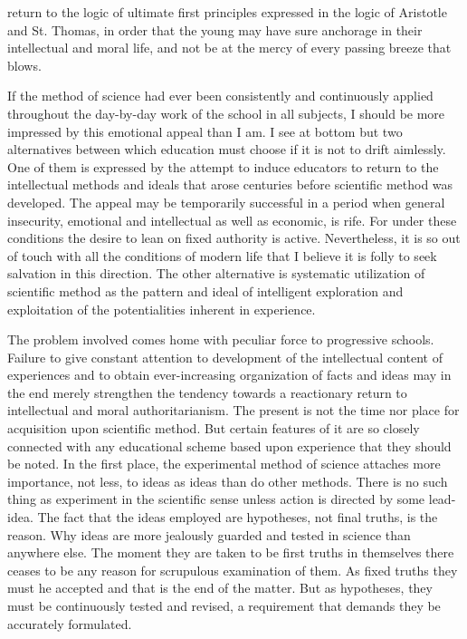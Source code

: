 return to the logic of ultimate first principles expressed in the logic of Aristotle and St. 
Thomas, in order that the young may have sure anchorage in their intellectual and moral 
life, and not be at the mercy of every passing breeze that blows. 

If the method of science had ever been consistently and continuously applied 
throughout the day-by-day work of the school in all subjects, I should be more impressed 
by this emotional appeal than I am. I see at bottom but two alternatives between which 
education must choose if it is not to drift aimlessly. One of them is expressed by the 
attempt to induce educators to return to the intellectual methods and ideals that arose 
centuries before scientific method was developed. The appeal may be temporarily 
successful in a period when general insecurity, emotional and intellectual as well as 
economic, is rife. For under these conditions the desire to lean on fixed authority is 
active. Nevertheless, it is so out of touch with all the conditions of modern life that I 
believe it is folly to seek salvation in this direction. The other alternative is systematic 
utilization of scientific method as the pattern and ideal of intelligent exploration and 
exploitation of the potentialities inherent in experience. 

The problem involved comes home with peculiar force to progressive schools. Failure 
to give constant attention to development of the intellectual content of experiences and to 
obtain ever-increasing organization of facts and ideas may in the end merely strengthen 
the tendency towards a reactionary return to intellectual and moral authoritarianism. The 
present is not the time nor place for acquisition upon scientific method. But certain 
features of it are so closely connected with any educational scheme based upon 
experience that they should be noted. In the first place, the experimental method of 
science attaches more importance, not less, to ideas as ideas than do other methods. There 
is no such thing as experiment in the scientific sense unless action is directed by some 
lead- idea. The fact that the ideas employed are hypotheses, not final truths, is the reason. 
Why ideas are more jealously guarded and tested in science than anywhere else. The 
moment they are taken to be first truths in themselves there ceases to be any reason for 
scrupulous examination of them. As fixed truths they must he accepted and that is the end 
of the matter. But as hypotheses, they must be continuously tested and revised, a 
requirement that demands they be accurately formulated. 

